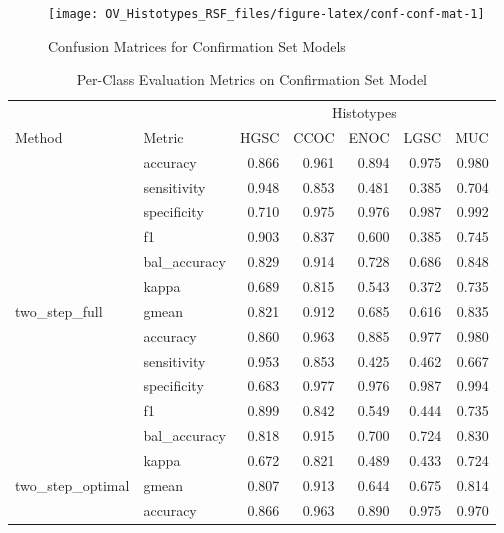 \documentclass[
]{report}
\begin{document}
\begin{figure}[H]

{\centering \texttt{[image: OV\_Histotypes\_RSF\_files/figure-latex/conf-conf-mat-1]} 

}

\caption{Confusion Matrices for Confirmation Set Models}\label{fig:conf-conf-mat}
\end{figure}

\begin{table}

\caption{\label{tab:conf-eval-per-class}Per-Class Evaluation Metrics on Confirmation Set Model}
\centering
\begin{tabular}[t]{l|l|r|r|r|r|r}
\hline
\multicolumn{2}{c|}{ } & \multicolumn{5}{c}{Histotypes} \\
\cline{3-7}
Method & Metric & HGSC & CCOC & ENOC & LGSC & MUC\\
\hline
 & accuracy & 0.866 & 0.961 & 0.894 & 0.975 & 0.980\\
\cline{2-7}
 & sensitivity & 0.948 & 0.853 & 0.481 & 0.385 & 0.704\\
\cline{2-7}
 & specificity & 0.710 & 0.975 & 0.976 & 0.987 & 0.992\\
\cline{2-7}
 & f1 & 0.903 & 0.837 & 0.600 & 0.385 & 0.745\\
\cline{2-7}
 & bal\_accuracy & 0.829 & 0.914 & 0.728 & 0.686 & 0.848\\
\cline{2-7}
 & kappa & 0.689 & 0.815 & 0.543 & 0.372 & 0.735\\
\cline{2-7}
\multirow{-7}{*}{\raggedright\arraybackslash two\_step\_full} & gmean & 0.821 & 0.912 & 0.685 & 0.616 & 0.835\\
\cline{1-7}
 & accuracy & 0.860 & 0.963 & 0.885 & 0.977 & 0.980\\
\cline{2-7}
 & sensitivity & 0.953 & 0.853 & 0.425 & 0.462 & 0.667\\
\cline{2-7}
 & specificity & 0.683 & 0.977 & 0.976 & 0.987 & 0.994\\
\cline{2-7}
 & f1 & 0.899 & 0.842 & 0.549 & 0.444 & 0.735\\
\cline{2-7}
 & bal\_accuracy & 0.818 & 0.915 & 0.700 & 0.724 & 0.830\\
\cline{2-7}
 & kappa & 0.672 & 0.821 & 0.489 & 0.433 & 0.724\\
\cline{2-7}
\multirow{-7}{*}{\raggedright\arraybackslash two\_step\_optimal} & gmean & 0.807 & 0.913 & 0.644 & 0.675 & 0.814\\
\cline{1-7}
 & accuracy & 0.866 & 0.963 & 0.890 & 0.975 & 0.970\\

\end{tabular}
\end{table}
\end{document}
